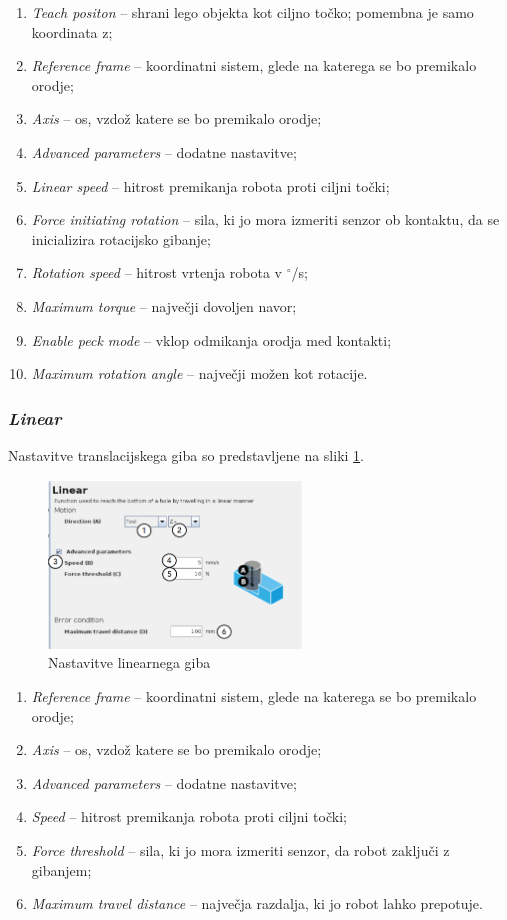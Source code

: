 \begin{enumerate}
  \item \emph{Teach positon} -- shrani lego objekta kot ciljno točko; pomembna je samo koordinata z;
  \item \emph{Reference frame} -- koordinatni sistem, glede na katerega se bo premikalo orodje;
  \item \emph{Axis} -- os, vzdož katere se bo premikalo orodje;
  \item \emph{Advanced parameters} -- dodatne nastavitve;
  \item \emph{Linear speed} -- hitrost premikanja robota proti ciljni točki;
  \item \emph{Force initiating rotation} -- sila, ki jo mora izmeriti senzor ob kontaktu, da se inicializira rotacijsko gibanje;
  \item \emph{Rotation speed} -- hitrost vrtenja robota v ${}^\circ$/s;
  \item \emph{Maximum torque} -- največji dovoljen navor;
  \item \emph{Enable peck mode} -- vklop odmikanja orodja med kontakti;
  \item \emph{Maximum rotation angle} -- največji možen kot rotacije.
\end{enumerate}


\subsubsection{\emph{Linear}}

Nastavitve translacijskega giba so predstavljene na sliki \ref{fig:ur_linear}.
\begin{figure}[!hbt]
\centering
\includegraphics[width=0.6\textwidth]{ur5e_linear.eps}
\caption{Nastavitve linearnega giba}
\label{fig:ur_linear}
\end{figure}

\begin{enumerate}
  \item \emph{Reference frame} -- koordinatni sistem, glede na katerega se bo premikalo orodje;
  \item \emph{Axis} -- os, vzdož katere se bo premikalo orodje;
  \item \emph{Advanced parameters} -- dodatne nastavitve;
  \item \emph{Speed} -- hitrost premikanja robota proti ciljni točki;
  \item \emph{Force threshold} -- sila, ki jo mora izmeriti senzor, da robot zaključi z gibanjem;
  \item \emph{Maximum travel distance} -- največja razdalja, ki jo robot lahko prepotuje.
\end{enumerate}

